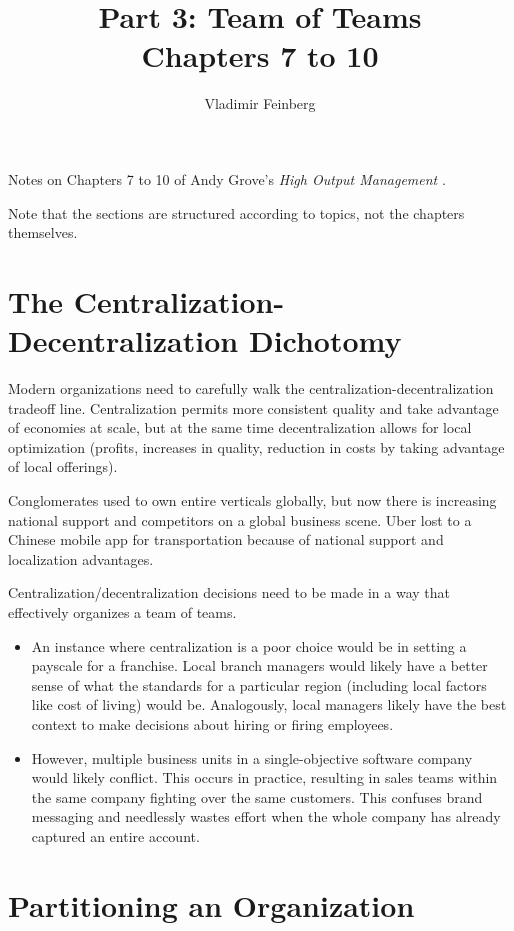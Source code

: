 \documentclass{article}
\title{Part 3: Team of Teams\\Chapters 7 to 10}
\author{Vladimir Feinberg}
\begin{document}
\maketitle

Notes on Chapters 7 to 10 of Andy Grove's \textit{High Output Management} \cite{highoutput}.

Note that the sections are structured according to topics, not the chapters themselves.

\section{The Centralization-Decentralization Dichotomy}

Modern organizations need to carefully walk the centralization-decentralization tradeoff line.
Centralization permits more consistent quality and take advantage of economies at scale, but at the same time decentralization allows for local optimization (profits, increases in quality, reduction in costs by taking advantage of local offerings).

Conglomerates used to own entire verticals globally, but now there is increasing national support and competitors on a global business scene.
Uber lost to a Chinese mobile app for transportation because of national support and localization advantages.

Centralization/decentralization decisions need to be made in a way that effectively organizes a team of teams.

\begin{itemize}
\item An instance where centralization is a poor choice would be in setting a payscale for a franchise. Local branch managers would likely have a better sense of what the standards for a particular region (including local factors like cost of living) would be. Analogously, local managers likely have the best context to make decisions about hiring or firing employees.
\item However, multiple business units in a single-objective software company would likely conflict. This occurs in practice, resulting in sales teams within the same company fighting over the same customers. This confuses brand messaging and needlessly wastes effort when the whole company has already captured an entire account.
\end{itemize}


\section{Partitioning an Organization}
\end{document}
